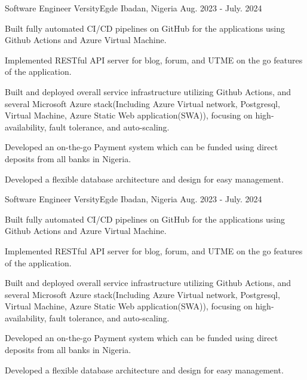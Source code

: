 

\begin{cventries}

  \cventry
    {Software Engineer} %
    {VersityEgde} %
    {Ibadan, Nigeria} %
    {Aug. 2023 - July. 2024} %
    {
      \begin{cvitems} %
        \item {Built fully automated CI/CD pipelines on GitHub for the applications using Github Actions and Azure Virtual Machine.}
        \item {Implemented RESTful API server for blog, forum, and UTME on the go features of the application.}
        \item {Built and deployed overall service infrastructure utilizing Github Actions, and several Microsoft Azure stack(Including Azure Virtual network, Postgresql, Virtual Machine, Azure Static Web application(SWA)), focusing on high-availability, fault tolerance, and auto-scaling.}
        \item {Developed an on-the-go Payment system which can be funded using direct deposits from all banks in Nigeria.}
        \item {Developed a flexible database architecture and design for easy management.}
      \end{cvitems}
    }

  \cventry
  {Software Engineer} %
  {VersityEgde} %
  {Ibadan, Nigeria} %
  {Aug. 2023 - July. 2024} %
  {
    \begin{cvitems} %
      \item {Built fully automated CI/CD pipelines on GitHub for the applications using Github Actions and Azure Virtual Machine.}
      \item {Implemented RESTful API server for blog, forum, and UTME on the go features of the application.}
      \item {Built and deployed overall service infrastructure utilizing Github Actions, and several Microsoft Azure stack(Including Azure Virtual network, Postgresql, Virtual Machine, Azure Static Web application(SWA)), focusing on high-availability, fault tolerance, and auto-scaling.}
      \item {Developed an on-the-go Payment system which can be funded using direct deposits from all banks in Nigeria.}
      \item {Developed a flexible database architecture and design for easy management.}
    \end{cvitems}
  }


\end{cventries}
